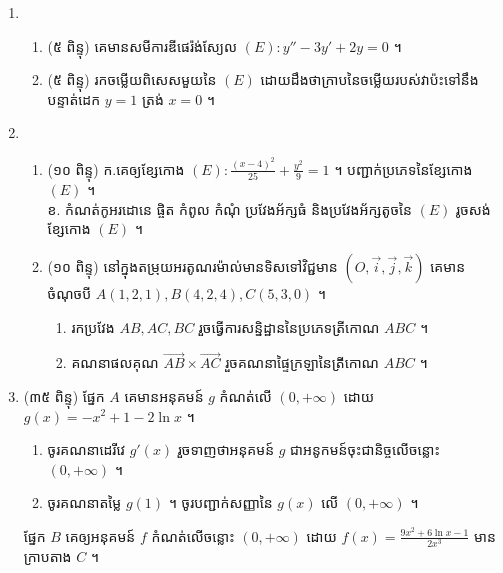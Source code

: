 \documentclass{officialexam}
\begin{document}
\begin{enumerate}[I]
\begin{enumerate}[1]
			\item {\color{khtug}(៥ ពិន្ទុ)} គេមានអនុគមន៍ $f(x)=-\frac{4-x}{\left(x-3\right)^2}$ កំណត់ចំពោះគ្រប់ $x\neq3$ បង្ហាញថា $f(x)=\frac{1}{x-3}-\frac{1}{\left(x-3\right)^2}$ ។\\ គណនា $\mathrm{K}=\int_{0}^{2}f(x)dx$ ។ 
		\end{enumerate}
		\item \begin{enumerate}[k]
			\item{\color{khtug}(៥ ពិន្ទុ)} គេមានសមីការឌីផេរ៉ង់ស្យែល $(E): y''-3y'+2y=0$ ។
			\item{\color{khtug}(៥ ពិន្ទុ)} រកចម្លើយពិសេសមួយនៃ $(E)$ ដោយដឹងថាក្រាបនៃចម្លើយរបស់វាប៉ះទៅនឹងបន្ទាត់ដេក $y=1$ ត្រង់ $x=0$ ។
		\end{enumerate}
		\item \begin{enumerate}[1]
			\item{\color{khtug}(១០ ពិន្ទុ)} ក.គេឲ្យខ្សែកោង $(E): \frac{\left(x-4\right)^2}{25}+\frac{y^2}{9}=1$ ។ បញ្ជាក់ប្រភេទនៃខ្សែកោង $(E)$ ។\\
			ខ. កំណត់កូអរដោនេ ផ្ចិត កំពូល កំណុំ ប្រវែងអ័ក្សធំ និងប្រវែងអ័ក្សតូចនៃ $(E)$ រូចសង់ខ្សែកោង $(E)$ ។
			\item {\color{khtug}(១០ ពិន្ទុ)} នៅក្នុងតម្រុយអរតូណរម៉ាល់មានទិសទៅវិជ្ជមាន $\left(O,\vec{i}, \vec{j}, \vec{k}\right)$ គេមានចំណុចបី $A(1,2,1),B(4,2,4),C(5,3,0)$ ។
			\begin{enumerate}[k]
				\item រកប្រវែង $AB, AC, BC$ រួចធ្វើការសន្និដ្ឋាននៃប្រភេទត្រីកោណ $ABC$ ។
				\item គណនាផលគុណ $\overrightarrow{AB}\times\overrightarrow{AC}$ រួចគណនាផ្ទៃក្រឡានៃត្រីកោណ $ABC$ ។
			\end{enumerate}
		\end{enumerate}
		\item {\color{khtug}(៣៥ ពិន្ទុ) \sffamily ផ្នែក $A$} គេមានអនុគមន៍ $g$ កំណត់លើ $(0, +\infty)$ ដោយ $g(x)=-x^2+1-2\ln x$ ។
		\begin{enumerate}[k]
			\item ចូរគណនាដេរីវេ $g'(x)$ រួចទាញថាអនុគមន៍ $g$ ជាអនូកមន៍ចុះជានិច្ចលើចន្លោះ $(0,+\infty)$ ។ 
			\item ចូរគណនាតម្លៃ $g(1)$ ។ ចូរបញ្ជាក់សញ្ញានៃ $g(x)$ លើ $(0, +\infty)$ ។
		\end{enumerate}
		{\color{khtug} \sffamily ផ្នែក $B$} គេឲ្យអនុគមន៍ $f$ កំណត់លើចន្លោះ $(0, +\infty)$ ដោយ $f(x)=\frac{9x^2+6\ln x-1}{2x^3}$ មានក្រាបតាង $C$ ។
		\begin{enumerate}[k]

\end{enumerate}
\end{enumerate}
\end{document}
